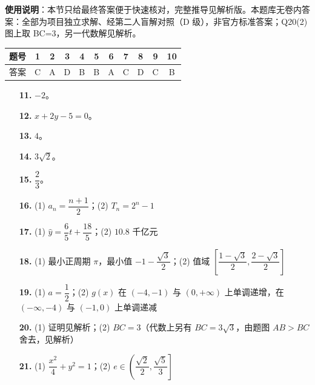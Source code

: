 
\begin{gknotice}
\textbf{使用说明}：本节只给最终答案便于快速核对，完整推导见解析版。本题库无卷内答案：全部为项目独立求解、经第二人盲解对照（D 级），非官方标准答案；Q20(2) 图上取 BC=3，另一代数解见解析。
\end{gknotice}

\begin{center}\begin{tabular}{ccccccccccc}
\toprule
题号 & 1 & 2 & 3 & 4 & 5 & 6 & 7 & 8 & 9 & 10 \\
\midrule
答案 & C & A & D & B & B & A & C & D & C & B \\
\bottomrule
\end{tabular}\end{center}

\begin{itemize}[leftmargin=2.6em]
  \item[\textbf{11.}] $-2$。
  \item[\textbf{12.}] $x+2y-5=0$。
  \item[\textbf{13.}] $4$。
  \item[\textbf{14.}] $3\sqrt{2}$。
  \item[\textbf{15.}] $\dfrac{2}{3}$。
\end{itemize}

\begin{itemize}[leftmargin=2.6em]
  \item[\textbf{16.}] (1) $a_{n}=\dfrac{n+1}{2}$；(2) $T_{n}=2^{n}-1$
  \item[\textbf{17.}] (1) $\hat{y}=\dfrac{6}{5}t+\dfrac{18}{5}$；(2) $10.8$ 千亿元
  \item[\textbf{18.}] (1) 最小正周期 $\pi$，最小值 $-1-\dfrac{\sqrt{3}}{2}$；(2) 值域 $\left[\dfrac{1-\sqrt{3}}{2},\dfrac{2-\sqrt{3}}{2}\right]$
  \item[\textbf{19.}] (1) $a=\dfrac{1}{2}$；(2) $g(x)$ 在 $(-4,-1)$ 与 $(0,+\infty)$ 上单调递增，在 $(-\infty,-4)$ 与 $(-1,0)$ 上单调递减
  \item[\textbf{20.}] (1) 证明见解析；(2) $BC=3$（代数上另有 $BC=3\sqrt3$，由题图 $AB>BC$ 舍去，见解析）
  \item[\textbf{21.}] (1) $\dfrac{x^{2}}{4}+y^{2}=1$；(2) $e\in\left(\dfrac{\sqrt{2}}{2},\dfrac{\sqrt{5}}{3}\right]$
\end{itemize}
